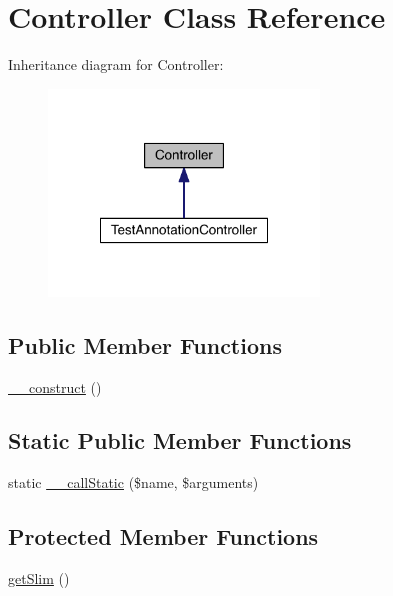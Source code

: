 \hypertarget{class_router_1_1_controller}{\section{Controller Class Reference}
\label{class_router_1_1_controller}
}


Inheritance diagram for Controller\-:
\nopagebreak
\begin{figure}[H]
\begin{center}
\leavevmode
\includegraphics[width=204pt]{class_router_1_1_controller__inherit__graph}
\end{center}
\end{figure}
\subsection*{Public Member Functions}
\begin{DoxyCompactItemize}
\item 
\hyperlink{class_router_1_1_controller_a095c5d389db211932136b53f25f39685}{\-\_\-\-\_\-construct} ()
\end{DoxyCompactItemize}
\subsection*{Static Public Member Functions}
\begin{DoxyCompactItemize}
\item 
static \hyperlink{class_router_1_1_controller_a61a19cb43fb2530a2f880c0d0672c471}{\-\_\-\-\_\-call\-Static} (\$name, \$arguments)
\end{DoxyCompactItemize}
\subsection*{Protected Member Functions}
\begin{DoxyCompactItemize}
\item 
\hyperlink{class_router_1_1_controller_a13dc0963bf0b83e970c808728faa54d3}{get\-Slim} ()
\end{DoxyCompactItemize}
